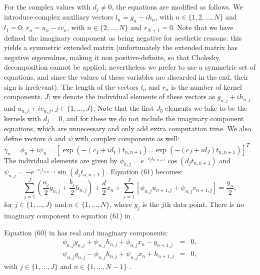 \documentclass[manuscript, letterpaper]{aastex6}
\begin{document}
For the complex values with $d_j \ne 0$, the equations are modified as follows.  We introduce complex
auxiliary vectors $l_n = g_n - i h_n$, with $n \in \{1,2,...,N\}$ and $l_1 = 0$; $r_n =
u_n - i v_n$, with $n \in \{2,...,N\}$ and $r_{N+1} = 0$.  Note that we have defined the
imaginary component as being negative for aesthetic reasons:  this yields a symmetric extended
matrix (unfortunately the extended matrix has negative eigenvalues, making it non positive-definite,
so that Cholesky decomposition cannot be applied; nevertheless we prefer to use a symmetric
set of equations, and since the values of these variables are discarded in the end, their sign
is irrelevant).  The length of the vectors $l_n$ and $r_n$
is the number of kernel components, $J$;  we denote the individual elements of these vectors
as $g_{n,j}+ih_{n,j}$ and $u_{n,j}+iv_{n,j}$, $j \in \{1,...,J\}$.  Note that the first $J_0$ elements we take
to be the kernels with $d_j=0$, and for these we do not include the imaginary component
equations, which are unnecessary and only add extra computation time.  We also define vectors $\phi$ and $\psi$ with
complex components as well:  $\gamma_n = \phi_n + i\psi_n = \left[\exp{(-(c_1+id_1) t_{n,n+1})} ... \exp{(-(c_J+id_J) t_{n,n+1})}\right]^T
$.  The individual elements are given by $\phi_{n,j} = e^{-c_j t_{n,n+1}}
\cos{(d_j t_{n,n+1})}$ and $\psi_{n,j} = -e^{-c_j t_{n,n+1}}\sin{(d_j t_{n,n+1})}$.
Equation (61) becomes:
\begin{equation} \label{Amb61}
\sum_{j=1}^J \left(\frac{a_j}{2} g_{n,j} +\frac{b_j}{2} h_{n,j}\right)+ \frac{d}{2} x_n + \sum_{j=1}^J \left[
\phi_{n,j} u_{n+1,j} + \psi_{n,j} v_{n+1,j}\right] = \frac{y_n}{2},
\end{equation}
for $j \in \{1,...,J\}$ and $n \in \{1,...,N\}$, where $y_j$ is the $j$th data point.  There is no imaginary component to equation (61)
in \citet{Ambikasaran:2015}.

Equation (60) in \citet{Ambikasaran:2015} has real and imaginary components:
\begin{eqnarray} \label{Amb60}
\phi_{n,j} g_{n,j} +\psi_{n,j} h_{n,j} + \phi_{n,j} x_n - g_{n+1,j} &=& 0,\\
\psi_{n,j} g_{n,j} -\phi_{n,j} h_{n,j} + \psi_{n,j} x_n + h_{n+1,j} &=& 0,
\end{eqnarray}
with $j \in \{1,...,J\}$ and $n \in \{1,...,N-1\}$
\citep[note that we have shifted the indices of this equation by one from the indexing using in][]{Ambikasaran:2015}.
\end{document}
